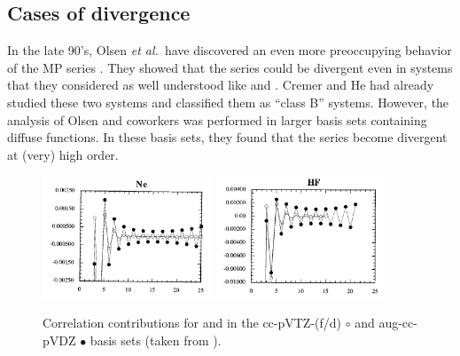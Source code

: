 \documentclass[11pt,a4paper]{article}
\begin{document}
\subsection{Cases of divergence}

In the late 90's, Olsen \textit{et al.}~have discovered an even more preoccupying behavior of the MP series \cite{}. They showed that the series could be divergent even in systems that they considered as well understood like  and  \cite{Olsen_1996, Christiansen_1996}. Cremer and He had already studied these two systems and classified them as ``class B'' systems. However, the analysis of Olsen and coworkers was performed in larger basis sets containing diffuse functions. In these basis sets, they found that the series become divergent at (very) high order.

\begin{figure}[h!]
    \centering
    \includegraphics[width=0.45\textwidth]{Nedivergence.png}
    \includegraphics[width=0.45\textwidth]{HFdivergence.png}
    \caption{\centering Correlation contributions for  and  in the cc-pVTZ-(f/d) $\circ$ and aug-cc-pVDZ $\bullet$ basis sets (taken from \cite{Olsen_1996}).}
    \label{fig:my_label}
\end{figure}
\end{document}
